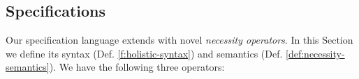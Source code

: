 



\subsection {\Nec Specifications}
\label{s:holistic-guarantees}

Our \Nec specification language extends \SpecO with novel 
 \emph{necessity operators}.
In this Section we define its syntax (Def. \ref{f:holistic-syntax}) and semantics 
(Def. \ref{def:necessity-semantics}).
We have the following three operators:
 



